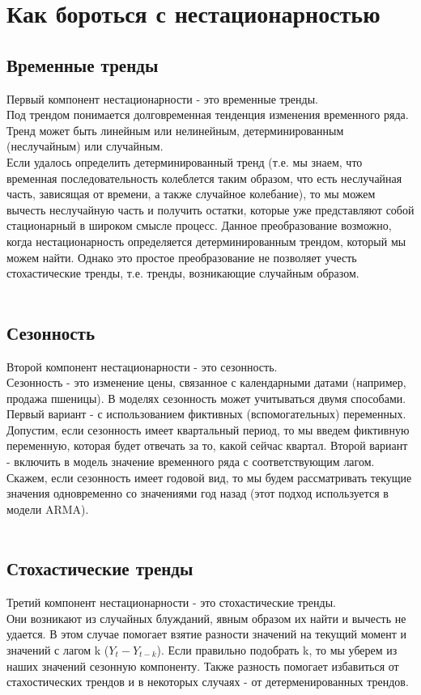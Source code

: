 \documentclass{article}
\begin{document}
\section{Как бороться с нестационарностью}

\begin{itemize}
    \subsection{Временные тренды}
    Первый компонент нестационарности - это временные тренды. 
    \\ Под трендом понимается долговременная тенденция изменения временного ряда. Тренд может быть  линейным или нелинейным, детерминированным (неслучайным) или случайным. 
    \\ Если удалось определить детерминированный тренд (т.е. мы знаем, что временная последовательность колеблется таким образом, что есть неслучайная часть, зависящая от времени, а также случайное колебание), то мы можем вычесть неслучайную часть и получить остатки, которые уже представляют собой стационарный в широком смысле процесс. Данное преобразование возможно, когда нестационарность определяется детерминированным трендом, который мы можем найти. Однако это простое преобразование не позволяет учесть стохастические тренды, т.е. тренды, возникающие случайным образом.
    \\
    \\
    \subsection{Сезонность}
    Второй компонент нестационарности - это сезонность.
    \\ Сезонность - это изменение цены, связанное с календарными датами (например, продажа пшеницы). В моделях сезонность может учитываться двумя способами. Первый вариант - с использованием фиктивных (вспомогательных) переменных. Допустим, если сезонность имеет квартальный период, то мы введем фиктивную переменную, которая будет отвечать за то, какой сейчас квартал. Второй вариант - включить в модель значение временного ряда с соответствующим лагом. Скажем, если сезонность имеет годовой вид, то мы будем рассматривать текущие значения одновременно со значениями год назад (этот подход используется в модели ARMA).
    \\
    \\
    \subsection{Стохастические тренды}
    Третий компонент нестационарности - это стохастические тренды.
    \\ Они возникают из случайных блужданий, явным образом их найти и вычесть не удается. В этом случае помогает взятие разности значений на текущий момент и значений с лагом k ($Y_t - Y_{t-k}$). Если правильно подобрать k, то мы уберем из наших значений сезонную компоненту. Также разность помогает избавиться от стахостических трендов и в некоторых случаях - от детерменированных трендов.
\end{itemize}
\end{document}

